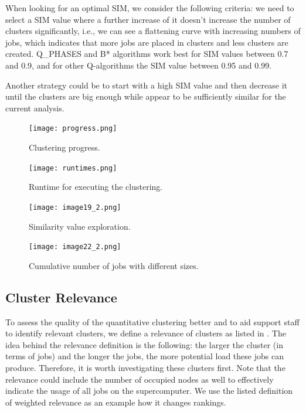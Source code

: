 \documentclass{jhps}
\begin{document}
When looking for an optimal SIM, we consider the following criteria:
we need to select a SIM value where a further increase of it doesn't increase the number of clusters significantly, i.e., we can see a flattening curve with increasing numbers of jobs, which indicates that more jobs are placed in clusters and less clusters are created.
Q\_PHASES and B* algorithms work best for SIM values between 0.7 and 0.9, and for other Q-algorithms the SIM value between 0.95 and 0.99.

Another strategy could be to start with a high SIM value and then decrease it until the clusters are big enough while appear to be sufficiently similar for the current analysis.

\begin{figure}
  \centering
   \texttt{[image: progress.png]}
   \caption{Clustering progress.}
   \label{fig:clustering_progress}
\end{figure}

\begin{figure}
  \centering
  \texttt{[image: runtimes.png]}
  \caption{Runtime for executing the clustering.}
  \label{fig:alg_runtimes}
\end{figure}


\begin{figure}
  \centering
  \texttt{[image: image19\_2.png]}
  \caption{Similarity value exploration.}
  \label{fig:sim_exploration}
\end{figure}

\begin{figure}
  \centering
  \texttt{[image: image22\_2.png]}
  \caption{Cumulative number of jobs with different sizes.}
  \label{fig:cum_num_job_sizes}
\end{figure}

\subsection{Cluster Relevance}

To assess the quality of the quantitative clustering better and to aid support staff to identify relevant clusters, we define a relevance of clusters as listed in .
The idea behind the relevance definition is the following: the larger the cluster (in terms of jobs) and the longer the jobs, the more potential load these jobs can produce.
Therefore, it is worth investigating these clusters first.
Note that the relevance could include the number of occupied nodes as well to effectively indicate the usage of all jobs on the supercomputer.
We use the listed definition of weighted relevance as an example how it changes rankings.
\end{document}
